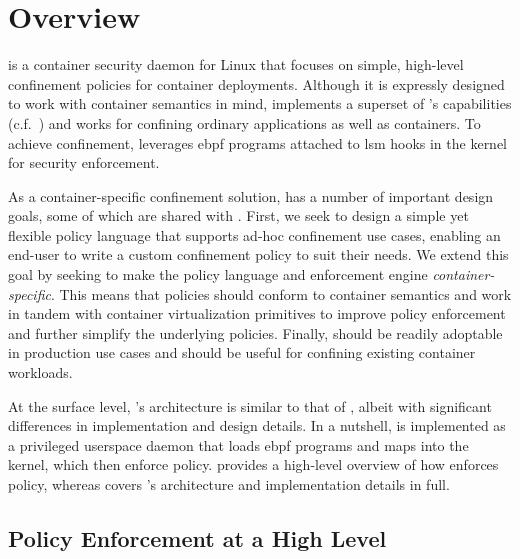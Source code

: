 
\section{\bpfcontain{} Overview}%
\label{s:bpfcontain-overview}

\bpfcontain{} is a container security daemon for Linux that focuses on simple, high-level
confinement policies for container deployments. Although it is expressly designed to work
with container semantics in mind, \bpfcontain{} implements a superset of \bpfbox{}'s
capabilities (c.f.~) and works for confining ordinary applications as well
as containers. To achieve confinement, \bpfcontain{} leverages \gls{ebpf} programs
attached to \gls{lsm} hooks in the kernel for security enforcement.

As a container-specific confinement solution, \bpfcontain{} has a number of important
design goals, some of which are shared with \bpfbox{}. First, we seek to design a simple
yet flexible policy language that supports ad-hoc confinement use cases, enabling an
end-user to write a custom confinement policy to suit their needs. We extend this goal by
seeking to make the policy language and enforcement engine \textit{container-specific}.
This means that \bpfcontain{} policies should conform to container semantics and work in
tandem with container virtualization primitives to improve policy enforcement and further
simplify the underlying policies. Finally, \bpfcontain{} should be readily adoptable in
production use cases and should be useful for confining existing container workloads.

At the surface level, \bpfcontain{}'s architecture is similar to that of \bpfbox{}, albeit
with significant differences in implementation and design details. In a nutshell,
\bpfcontain{} is implemented as a privileged userspace daemon that loads \gls{ebpf}
programs and maps into the kernel, which then enforce policy.
 provides a high-level overview of how
\bpfcontain{} enforces policy, whereas  covers
\bpfcontain{}'s architecture and implementation details in full.

\subsection{Policy Enforcement at a High Level}%
\label{ss:bpfcontain-enforcement-overview}

